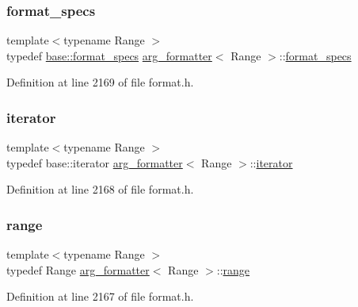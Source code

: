 \subsubsection{\texorpdfstring{format\+\_\+specs}{format\_specs}}
{\footnotesize\ttfamily template$<$typename Range $>$ \\
typedef \hyperlink{classinternal_1_1arg__formatter__base_acff46f7da1afa536210eb77a2ea0d775}{base\+::format\+\_\+specs} \hyperlink{classarg__formatter}{arg\+\_\+formatter}$<$ Range $>$\+::\hyperlink{classinternal_1_1arg__formatter__base_acff46f7da1afa536210eb77a2ea0d775}{format\+\_\+specs}}



Definition at line 2169 of file format.\+h.

\mbox{\label{classarg__formatter_a8bdde3948f23cf63cdcb36b82a927199}} 
\subsubsection{\texorpdfstring{iterator}{iterator}}
{\footnotesize\ttfamily template$<$typename Range $>$ \\
typedef base\+::iterator \hyperlink{classarg__formatter}{arg\+\_\+formatter}$<$ Range $>$\+::\hyperlink{classarg__formatter_a8bdde3948f23cf63cdcb36b82a927199}{iterator}}



Definition at line 2168 of file format.\+h.

\mbox{\label{classarg__formatter_a088e253d561ae361330c296be28af81b}} 
\subsubsection{\texorpdfstring{range}{range}}
{\footnotesize\ttfamily template$<$typename Range $>$ \\
typedef Range \hyperlink{classarg__formatter}{arg\+\_\+formatter}$<$ Range $>$\+::\hyperlink{classarg__formatter_a088e253d561ae361330c296be28af81b}{range}}



Definition at line 2167 of file format.\+h.



